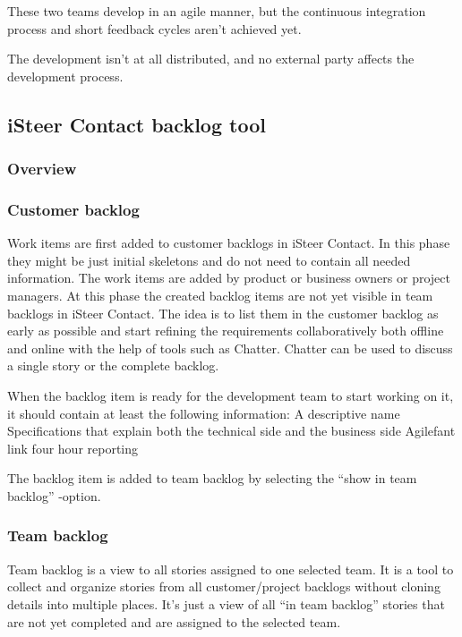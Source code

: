 \documentclass[english]{tktltiki2}
\theoremstyle{definition}
\theoremstyle{remark}
\begin{document}
These two teams develop in an agile manner, but the continuous integration process \cite{fowler2006continuous} and short feedback cycles aren't achieved yet. 

The development isn't at all distributed, and no external party affects the development process. 

\subsection{iSteer Contact backlog tool}

\subsubsection{Overview}

\subsubsection{Customer backlog}
Work items are first added to customer backlogs in iSteer Contact. In this phase they might be just initial skeletons and do not need to contain all needed information. The work items are added by product or business owners or project managers. At this phase the created backlog items are not yet visible in team backlogs in iSteer Contact. The idea is to list them in the customer backlog as early as possible and start refining the requirements collaboratively both offline and online with the help of tools such as Chatter. Chatter can be used to discuss a single story or the complete backlog.

When the backlog item is ready for the development team to start working on it, it should contain at least the following information:
A descriptive name
Specifications that explain both the technical side and the business side
Agilefant link four hour reporting

The backlog item is added to team backlog by selecting the “show in team backlog” -option.

\subsubsection{Team backlog}
Team backlog is a view to all stories assigned to one selected team. It is a tool to collect and organize stories from all customer/project backlogs without cloning details into multiple places. It’s just a view of all “in team backlog” stories that are not yet completed and are assigned to the selected team.
\end{document}
